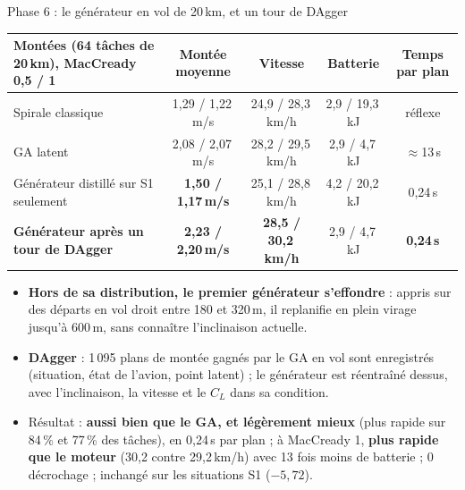 \documentclass[aspectratio=169,10pt]{beamer}
\newcommand{\good}[1]{\textcolor{climb}{\textbf{#1}}}
\newcommand{\bad}[1]{\textcolor{sink}{\textbf{#1}}}
\begin{document}
\begin{frame}{Phase 6 : le générateur en vol de 20\,km, et un tour de DAgger}
  \scriptsize
  \centering
  \begin{tabular}{@{}lcccc@{}}
    \toprule
    Montées (64 tâches de 20\,km), MacCready 0{,}5 / 1 & Montée moyenne & Vitesse & Batterie & Temps par plan \\ \midrule
    Spirale classique & 1{,}29 / 1{,}22\,m/s & 24{,}9 / 28{,}3\,km/h & 2{,}9 / 19{,}3\,kJ & réflexe \\
    GA latent & 2{,}08 / 2{,}07\,m/s & 28{,}2 / 29{,}5\,km/h & 2{,}9 / 4{,}7\,kJ & $\approx$13\,s \\
    Générateur distillé sur S1 seulement & \bad{1{,}50 / 1{,}17\,m/s} & 25{,}1 / 28{,}8\,km/h & 4{,}2 / 20{,}2\,kJ & 0{,}24\,s \\
    \textbf{Générateur après un tour de DAgger} & \good{2{,}23 / 2{,}20\,m/s} & \good{28{,}5 / 30{,}2\,km/h} & 2{,}9 / 4{,}7\,kJ & \good{0{,}24\,s} \\
    \bottomrule
  \end{tabular}\par\medskip
  \small
  \begin{itemize}
    \item \textbf{Hors de sa distribution, le premier générateur s'effondre} : appris sur des départs en vol droit entre 180 et 320\,m, il replanifie en plein virage jusqu'à 600\,m, sans connaître l'inclinaison actuelle.
    \item \textbf{DAgger} : 1\,095 plans de montée gagnés par le GA en vol sont enregistrés (situation, état de l'avion, point latent) ; le générateur est réentraîné dessus, avec l'inclinaison, la vitesse et le $C_L$ dans sa condition.
    \item Résultat : \good{aussi bien que le GA, et légèrement mieux} (plus rapide sur 84\,\% et 77\,\% des tâches), en 0{,}24\,s par plan ; à MacCready 1, \good{plus rapide que le moteur} (30{,}2 contre 29{,}2\,km/h) avec 13 fois moins de batterie ; 0 décrochage ; inchangé sur les situations S1 ($-5{,}72$).
  \end{itemize}
\end{frame}
\end{document}
